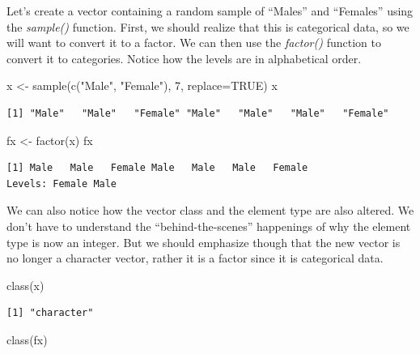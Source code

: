 \documentclass[
  letterpaper,
  DIV=11,
  numbers=noendperiod]{scrreprt}
\newenvironment{Shaded}{\begin{snugshade}}{\end{snugshade}}
\newcommand{\AttributeTok}[1]{\textcolor[rgb]{0.40,0.45,0.13}{#1}}
\newcommand{\ConstantTok}[1]{\textcolor[rgb]{0.56,0.35,0.01}{#1}}
\newcommand{\DecValTok}[1]{\textcolor[rgb]{0.68,0.00,0.00}{#1}}
\newcommand{\FunctionTok}[1]{\textcolor[rgb]{0.28,0.35,0.67}{#1}}
\newcommand{\NormalTok}[1]{\textcolor[rgb]{0.00,0.23,0.31}{#1}}
\newcommand{\OtherTok}[1]{\textcolor[rgb]{0.00,0.23,0.31}{#1}}
\newcommand{\StringTok}[1]{\textcolor[rgb]{0.13,0.47,0.30}{#1}}
\begin{document}
Let's create a vector containing a random sample of ``Males'' and
``Females'' using the \emph{sample()} function. First, we should realize
that this is categorical data, so we will want to convert it to a
factor. We can then use the \emph{factor()} function to convert it to
categories. Notice how the levels are in alphabetical order.

\begin{Shaded}
\begin{Highlighting}[]
\NormalTok{x }\OtherTok{\textless{}{-}} \FunctionTok{sample}\NormalTok{(}\FunctionTok{c}\NormalTok{(}\StringTok{"Male"}\NormalTok{, }\StringTok{"Female"}\NormalTok{), }\DecValTok{7}\NormalTok{, }\AttributeTok{replace=}\ConstantTok{TRUE}\NormalTok{)}
\NormalTok{x}
\end{Highlighting}
\end{Shaded}

\begin{verbatim}
[1] "Male"   "Male"   "Female" "Male"   "Male"   "Male"   "Female"
\end{verbatim}

\begin{Shaded}
\begin{Highlighting}[]
\NormalTok{fx }\OtherTok{\textless{}{-}} \FunctionTok{factor}\NormalTok{(x)}
\NormalTok{fx}
\end{Highlighting}
\end{Shaded}

\begin{verbatim}
[1] Male   Male   Female Male   Male   Male   Female
Levels: Female Male
\end{verbatim}

We can also notice how the vector class and the element type are also
altered. We don't have to understand the ``behind-the-scenes''
happenings of why the element type is now an integer. But we should
emphasize though that the new vector is no longer a character vector,
rather it is a factor since it is categorical data.

\begin{Shaded}
\begin{Highlighting}[]
\FunctionTok{class}\NormalTok{(x)}
\end{Highlighting}
\end{Shaded}

\begin{verbatim}
[1] "character"
\end{verbatim}

\begin{Shaded}
\begin{Highlighting}[]
\FunctionTok{class}\NormalTok{(fx)}
\end{Highlighting}
\end{Shaded}
\end{document}
